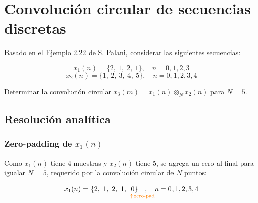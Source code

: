 \documentclass[../Main_Include.tex]{subfiles}
\begin{document}
%
%
%

\newcommand{\tituloinforme}{Transformadas de Fourier Discreta y Rápida — Laboratorio 2}

\section{Convolución circular de secuencias discretas}

Basado en el Ejemplo 2.22 de S. Palani, considerar las siguientes secuencias:

\[
    x_1(n) = \{2,\ 1,\ 2,\ 1\}, \quad n = 0,1,2,3
\]
\[
    x_2(n) = \{1,\ 2,\ 3,\ 4,\ 5\}, \quad n = 0,1,2,3,4
\]

Determinar la convolución circular $x_3(m) = x_1(n) \circledcirc_N x_2(n)$ para $N = 5$.

\subsection*{Resolución analítica}

\subsubsection*{Zero-padding de \boldmath$x_1(n)$}

Como $x_1(n)$ tiene 4 muestras y $x_2(n)$ tiene 5, se agrega un cero al final
para igualar $N = 5$, requerido por la convolución circular de $N$ puntos:

\[
    x_1(n) = \{2,\ 1,\ 2,\ 1,\ \underset{\textcolor{orange}{\uparrow}\,\scriptsize\textcolor{orange}{\text{zero-pad}}}{0 \}  \quad , \quad  } n = 0,1,2,3,4
\]
\end{document}
